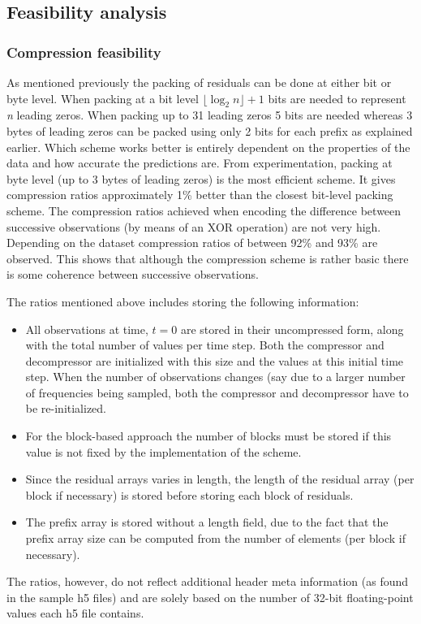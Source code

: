  \subsection{Feasibility analysis}
  \subsubsection{Compression feasibility}
  As mentioned previously the packing of residuals can be done at either bit or byte level. When packing at a bit level $\lfloor\log_2n\rfloor + 1$ bits are needed to represent
  \textit{n} leading zeros. When packing up to 31 leading zeros 5 bits are needed whereas 3 bytes of leading zeros can be packed using only 2 bits for each prefix as explained earlier. Which scheme
  works better is entirely dependent on the properties of the data and how accurate the predictions are. From experimentation, packing at byte level (up to 3 bytes of leading zeros) is the most 
  efficient scheme. It gives compression ratios approximately 1\% better than the closest bit-level packing scheme. The compression ratios achieved when encoding the
  difference between successive observations (by means of an XOR operation) are not very high. Depending on the dataset compression ratios of between 92\% and 93\% are observed. This shows that 
  although the compression scheme is rather basic there is some coherence between successive observations. 
  
  The ratios mentioned above includes storing the following information:
  \begin{itemize}
   \item All observations at time, $t=0$ are stored in their uncompressed form, along with the total number of values per time step. Both the compressor and decompressor are 
   initialized with this size and the values at this initial time step. When the number of observations changes (say due to a larger number of frequencies being sampled, both the
   compressor and decompressor have to be re-initialized.
   \item For the block-based approach the number of blocks must be stored if this value is not fixed by the implementation of the scheme.
   \item Since the residual arrays varies in length, the length of the residual array (per block if necessary) is stored before storing each block of residuals.
   \item The prefix array is stored without a length field, due to the fact that the prefix array size can be computed from the number of elements (per block if necessary).
  \end{itemize}
  The ratios, however, do not reflect additional header meta information (as found in the sample h5 files) and are solely based on the number of 32-bit floating-point values each
  h5 file contains. 
